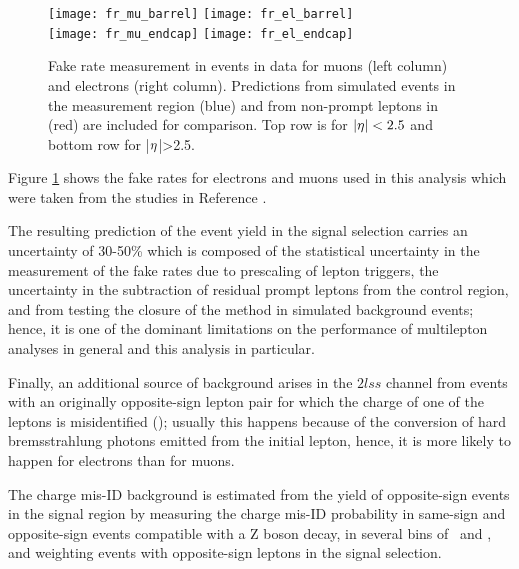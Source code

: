 \begin{figure}[htb]
\centering
        \texttt{[image: fr\_mu\_barrel]}
        \texttt{[image: fr\_el\_barrel]} \\
        \texttt{[image: fr\_mu\_endcap]}
        \texttt{[image: fr\_el\_endcap]}
\caption[Fake rates]{Fake rate measurement in events in data for muons (left column) and electrons (right column). Predictions from simulated events in the measurement region (blue) and from non-prompt leptons in \ttbar (red) are included for comparison. Top row is for ${|\eta|<2.5}$ and bottom row for |$\eta$|>2.5.}
\label{fig:frmeas-comb-data}
\end{figure}

Figure \ref{fig:frmeas-comb-data} shows the fake rates for electrons and muons used in this analysis which were taken from the studies in Reference \cite{CMS_AN_2017-029}.

The resulting prediction of the event yield in the signal selection carries an uncertainty of 30-50\% which is composed of the statistical uncertainty in the measurement of the fake rates due to prescaling of lepton triggers, the uncertainty in the subtraction of residual prompt leptons from the control region, and from testing the closure of the method in simulated background events; hence, it is one of the dominant limitations on the performance of multilepton analyses in general and this analysis in particular.

Finally, an additional source of background arises in the $2lss$ channel from events with an originally opposite-sign lepton pair for which the charge of one of the leptons is misidentified (); usually this happens because of the conversion of hard bremsstrahlung photons emitted from the initial lepton, hence, it is more likely to happen for electrons than for muons.

The charge mis-ID background is estimated from the yield of opposite-sign events in the signal region by measuring the charge mis-ID probability in same-sign and opposite-sign events compatible with a Z boson decay, in several bins of \pt\ and \etac, and weighting events with opposite-sign leptons in the signal selection.

